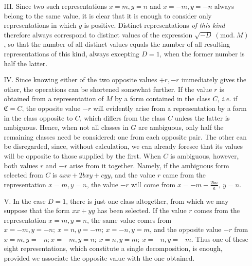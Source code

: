 III. Since two such representations \(x=m,\allowbreak y=n\) and \(x=-m,\allowbreak y=-n\) always belong to the same value, it is clear that it is enough to consider only representations in which \(y\) is positive. Distinct representations \textit{of this kind} therefore always correspond to distinct values of the expression \(\surd{-D}\ (\mathrm{mod.}\ M)\), so that the number of all distinct values equals the number of all resulting representations of this kind, always excepting \(D=1\), when the former number is half the latter.

IV. Since knowing either of the two opposite values \(+r,\allowbreak -r\) immediately gives the other, the operations can be shortened somewhat further. If the value \(r\) is obtained from a representation of \(M\) by a form contained in the class \(C\), \textit{i.e.} if \(\mathfrak C=C\), the opposite value \(-r\) will evidently arise from a representation by a form in the class opposite to \(C\), which differs from the class \(C\) unless the latter is ambiguous. Hence, when not all classes in \(G\) are ambiguous, only half the remaining classes need be considered: one from each opposite pair. The other can be disregarded, since, without calculation, we can already foresee that its values will be opposite to those supplied by the first. When \(C\) is ambiguous, however, both values \(r\) and \(-r\) arise from it together. Namely, if the ambiguous form selected from \(C\) is
\(axx+2bxy+cyy\), and the value \(r\) came from the representation \(x=m,\allowbreak y=n\), the value \(-r\) will come from \(x=-m-\frac{2bn}{a},\allowbreak \ y=n\).

\begin{samepage}
V. In the case \(D=1\), there is just one class altogether, from which we may suppose that the form \(xx+yy\) has been selected. If the value \(r\) comes from the representation \(x=m,\allowbreak y=n\), the same value comes from \(x=-m,\allowbreak y=-n;\allowbreak \ x=n,\allowbreak y=-m;\allowbreak \ x=-n,\allowbreak y=m\), and the opposite value \(-r\) from \(x=m,\allowbreak y=-n;\allowbreak x=-m,\allowbreak y=n;\allowbreak \ x=n,\allowbreak y=m;\allowbreak \ x=-n,\allowbreak y=-m\). Thus one of these eight representations, which constitute a single decomposition, is enough, provided we associate the opposite value with the one obtained.
\par\end{samepage}

